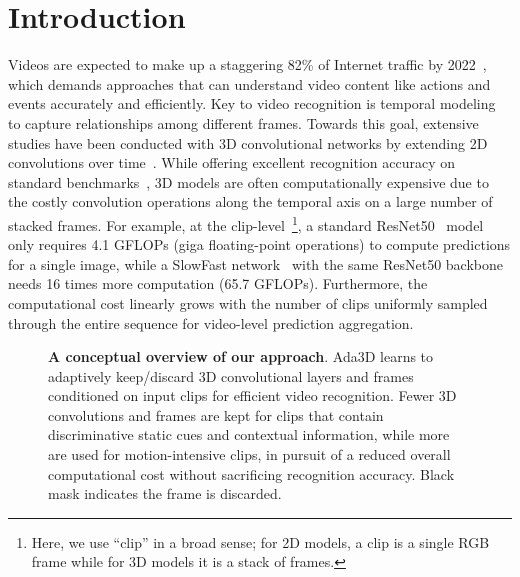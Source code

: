 \documentclass[final]{cvpr}
\newcommand{\system}{{Ada3D}\xspace}
\begin{document}
\section{Introduction}
Videos are expected to make up a staggering 82\% of Internet traffic by 2022~\cite{videotraffic}, which demands approaches that can understand video content like actions and events accurately and efficiently.  Key to video recognition is temporal modeling to capture relationships among different frames. Towards this goal, extensive studies have been conducted with 3D convolutional networks by extending 2D convolutions over time~\cite{c3d,quovadis,r21d,channelseparated,slowfast,x3d,tpn}.  While offering excellent recognition accuracy on standard benchmarks~\cite{quovadis,sthsth,anet}, 3D models are often computationally expensive due to the costly convolution operations along the temporal axis on a large number of stacked frames. For example, at the clip-level~\footnote{Here, we use ``clip'' in a broad sense; for 2D models, a clip is a single RGB frame while for 3D models it is a stack of frames.}, a standard ResNet50~\cite{resnet} model only requires 4.1 GFLOPs (giga floating-point operations) to compute predictions for a single image, while a SlowFast network~\cite{slowfast} with the same ResNet50 backbone needs 16 times more computation (65.7 GFLOPs). Furthermore, the computational cost linearly grows with the number of clips uniformly sampled through the entire sequence for video-level prediction aggregation.

\begin{figure}[!t] \centering
    \vspace{-0.13in}
    \caption{\textbf{A conceptual overview of our approach}. \system learns to adaptively keep/discard 3D convolutional layers and frames conditioned on input clips for efficient video recognition. Fewer 3D convolutions and frames are kept for clips that contain discriminative static cues and contextual information, while more are used for motion-intensive clips, in pursuit of a reduced overall computational cost without sacrificing recognition accuracy. Black mask indicates the frame is discarded.}
   \label{fig:teaser}
   \end{figure}
\end{document}
